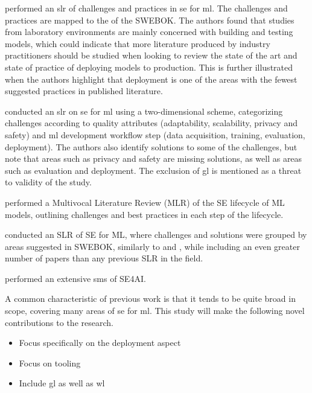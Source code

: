 \textcite{Nascimento2020} performed an \acrshort{slr} of challenges and practices in \acrshort{se} for \acrshort{ml}. The challenges and practices are mapped to the  of the SWEBOK.
The authors found that studies from laboratory environments are mainly concerned with building and testing models, which could indicate that more literature produced by industry practitioners should be studied when looking to review the state of the art and state of practice of deploying models to production.
This is further illustrated when the authors highlight that deployment is one of the areas with the fewest suggested practices in published literature.

\textcite{Lwakatare2020} conducted an \acrshort{slr} on  \acrshort{se} for \acrshort{ml} using a two-dimensional scheme, categorizing challenges according to quality attributes (adaptability, scalability, privacy and safety) and \acrshort{ml} development workflow step (data acquisition, training, evaluation, deployment).
The authors also identify solutions to some of the challenges, but note that areas such as privacy and safety are missing solutions, as well as areas such as evaluation and deployment.
The exclusion of \acrshort{gl} is mentioned as a threat to validity of the study.




\textcite{John2021} performed a Multivocal Literature Review (MLR) of the SE lifecycle of ML models, outlining challenges and best practices in each step of the lifecycle.

\textcite{Giray2021} conducted an SLR of SE for ML, where challenges and solutions were grouped by areas suggested in SWEBOK, similarly to \cite{Kumeno2020} and \cite{Nascimento2020}, while including an even greater number of papers than any previous SLR in the field.


\textcite{MartinezFernandez2021} performed an extensive \acrshort{sms} of SE4AI.


A common characteristic of previous work is that it tends to be quite broad in scope, covering many areas of \acrshort{se} for \acrshort{ml}.
This study will make the following novel contributions to the research.
\begin{itemize}
    \item Focus specifically on the deployment aspect
    \item Focus on tooling
    \item Include \acrshort{gl} as well as \acrshort{wl}
\end{itemize}


